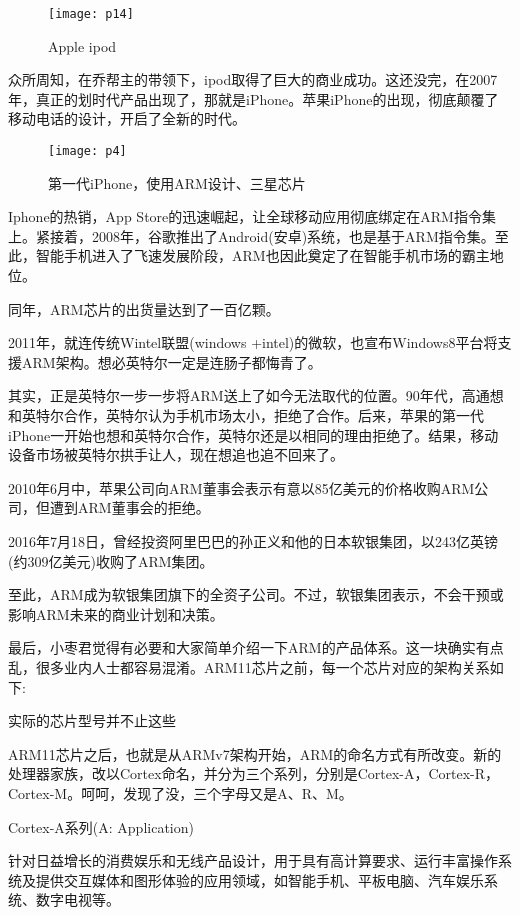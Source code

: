 \documentclass[utf8]{book}
\begin{document}
	\begin{figure}[H]
	\centering
	\texttt{[image: p14]}
	\caption{Apple ipod}
	\end{figure}
	

	众所周知，在乔帮主的带领下，ipod取得了巨大的商业成功。这还没完，在2007年，真正的划时代产品出现了，那就是iPhone。苹果iPhone的出现，彻底颠覆了移动电话的设计，开启了全新的时代。
	
	\begin{figure}[H]
		\centering
		\texttt{[image: p4]}
		\caption{第一代iPhone，使用ARM设计、三星芯片}
	\end{figure}
	

	Iphone的热销，App Store的迅速崛起，让全球移动应用彻底绑定在ARM指令集上。紧接着，2008年，谷歌推出了Android(安卓)系统，也是基于ARM指令集。至此，智能手机进入了飞速发展阶段，ARM也因此奠定了在智能手机市场的霸主地位。

	同年，ARM芯片的出货量达到了一百亿颗。

	2011年，就连传统Wintel联盟(windows +intel)的微软，也宣布Windows8平台将支援ARM架构。想必英特尔一定是连肠子都悔青了。



	其实，正是英特尔一步一步将ARM送上了如今无法取代的位置。90年代，高通想和英特尔合作，英特尔认为手机市场太小，拒绝了合作。后来，苹果的第一代iPhone一开始也想和英特尔合作，英特尔还是以相同的理由拒绝了。结果，移动设备市场被英特尔拱手让人，现在想追也追不回来了。

	2010年6月中，苹果公司向ARM董事会表示有意以85亿美元的价格收购ARM公司，但遭到ARM董事会的拒绝。

	2016年7月18日，曾经投资阿里巴巴的孙正义和他的日本软银集团，以243亿英镑(约309亿美元)收购了ARM集团。


	至此，ARM成为软银集团旗下的全资子公司。不过，软银集团表示，不会干预或影响ARM未来的商业计划和决策。

	最后，小枣君觉得有必要和大家简单介绍一下ARM的产品体系。这一块确实有点乱，很多业内人士都容易混淆。ARM11芯片之前，每一个芯片对应的架构关系如下: 


	实际的芯片型号并不止这些

	ARM11芯片之后，也就是从ARMv7架构开始，ARM的命名方式有所改变。新的处理器家族，改以Cortex命名，并分为三个系列，分别是Cortex-A，Cortex-R，Cortex-M。呵呵，发现了没，三个字母又是A、R、M。

	Cortex-A系列(A: Application)

	针对日益增长的消费娱乐和无线产品设计，用于具有高计算要求、运行丰富操作系统及提供交互媒体和图形体验的应用领域，如智能手机、平板电脑、汽车娱乐系统、数字电视等。
\end{document}
